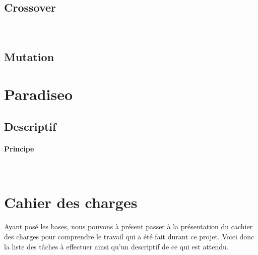 \documentclass[a4paper,10pt]{report}
\begin{document}
	    \paragraph{} 
	   
	 
	 \subsection{Crossover}

	    \paragraph{} 
	      ~~\\
	      
	     
	 \subsection{Mutation}
	 
	    \paragraph{}
		

      \section{Paradiseo}

	\subsection{Descriptif}
	
	  \paragraph{Principe} 
	      ~~\\
	      
	       
	
    \section{Cahier des charges}
    
     Ayant posé les bases, nous pouvons à présent passer à la présentation du cachier des charges pour comprendre le travail qui a été fait  durant ce projet.
     Voici donc la liste des tâches à effectuer ainsi qu'un descriptif de ce qui est attendu. 
      
\end{document}
